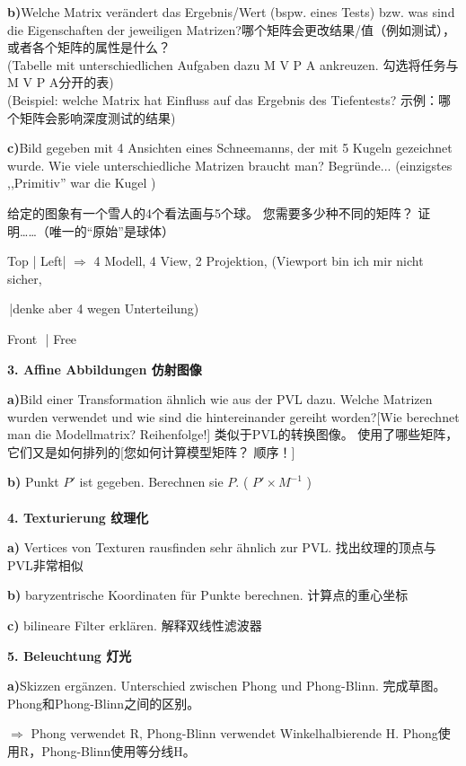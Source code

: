 \documentclass[fleqn]{article}
\begin{document}
\indent\textbf{b)}Welche Matrix verändert das Ergebnis/Wert (bspw. eines Tests) bzw. was sind die Eigenschaften der jeweiligen Matrizen?哪个矩阵会更改结果/值（例如测试），或者各个矩阵的属性是什么？ 
\\(Tabelle mit unterschiedlichen Aufgaben dazu M V P A ankreuzen. 勾选将任务与M V P A分开的表) 
\\(Beispiel: welche Matrix hat Einfluss auf das Ergebnis des Tiefentests? 示例：哪个矩阵会影响深度测试的结果)

\indent\textbf{c)}Bild gegeben mit 4 Ansichten eines Schneemanns, der mit 5 Kugeln gezeichnet wurde. Wie viele unterschiedliche Matrizen braucht man? Begründe... (einzigstes  ,,Primitiv'' war die Kugel )

给定的图象有一个雪人的4个看法画与5个球。 您需要多少种不同的矩阵？ 证明……（唯一的“原始”是球体）

Top \qquad | Left\qquad |   \qquad$\Rightarrow$ 4 Modell, 4 View, 2 Projektion, (Viewport bin ich mir nicht sicher, 

\hdashrule[0.5ex]{2.8cm}{1pt}{2mm} \,|\qquad\qquad\qquad\qquad\qquad\qquad\qquad\qquad\qquad denke aber 4 wegen Unterteilung)
    
Front \,\,\quad | Free

\noindent\textbf{3. Affine Abbildungen 仿射图像}

\indent\textbf{a)}Bild einer Transformation ähnlich wie aus der PVL dazu. Welche Matrizen wurden verwendet und wie sind die hintereinander gereiht worden?[Wie berechnet man die Modellmatrix? Reihenfolge!]
类似于PVL的转换图像。 使用了哪些矩阵，它们又是如何排列的[您如何计算模型矩阵？ 顺序！]

\indent\textbf{b)} Punkt $P'$ ist gegeben. Berechnen sie $P$. ( $P' \times M^{-1}$ )
\\
\\
\noindent\textbf{4. Texturierung 纹理化}

\indent\textbf{a)} Vertices von Texturen rausfinden sehr ähnlich zur PVL. 找出纹理的顶点与PVL非常相似

\indent\textbf{b)} baryzentrische Koordinaten für Punkte berechnen. 计算点的重心坐标

\indent\textbf{c)} bilineare Filter erklären. 解释双线性滤波器

\noindent\textbf{5. Beleuchtung 灯光}

\indent\textbf{a)}Skizzen ergänzen. Unterschied zwischen Phong und Phong-Blinn. 完成草图。 Phong和Phong-Blinn之间的区别。 

\qquad $\Rightarrow$ Phong verwendet R, Phong-Blinn verwendet Winkelhalbierende H. Phong使用R，Phong-Blinn使用等分线H。
\end{document}
